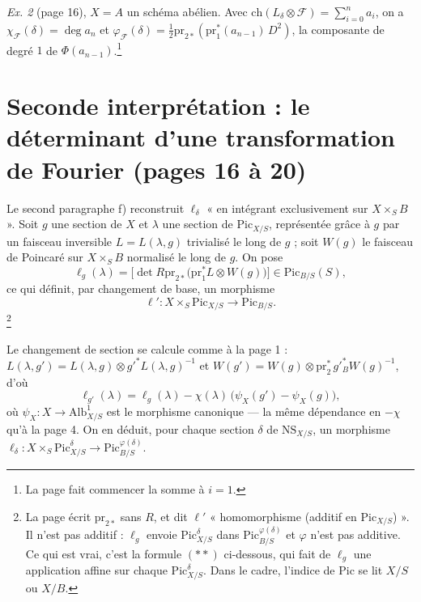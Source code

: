 \documentclass[11pt,a4paper]{article}
\begin{document}
\emph{Ex. 2} (page 16), $X = A$ un schéma abélien. Avec $\mathrm{ch}(L_{\delta}
\otimes \mathcal{F}) = \sum_{i=0}^{n} a_i$, on a $\chi_{\mathcal{F}}(\delta) =
\deg a_n$ et $\varphi_{\mathcal{F}}(\delta) = \tfrac{1}{2}\mathrm{pr}_{2*}
(\mathrm{pr}_1^{*}(a_{n-1})\,D^{2})$, la composante de degré $1$ de
$\Phi(a_{n-1})$.\footnote{La page fait commencer la somme à $i = 1$.}

\section*{Seconde interprétation : le déterminant d'une transformation de Fourier (pages 16 à 20)}

Le second paragraphe f) reconstruit $\ell_{\delta}$ « en intégrant
exclusivement sur $X \times_S B$ ». Soit $g$ une section de $X$ et $\lambda$
une section de $\mathrm{Pic}_{X/S}$, représentée grâce à $g$ par un faisceau
inversible $L = L(\lambda, g)$ trivialisé le long de $g$ ; soit $W(g)$ le
faisceau de Poincaré sur $X \times_S B$ normalisé le long de $g$. On pose
\[
\ell_g(\lambda) = \bigl[\det R\mathrm{pr}_{2*}\bigl(\mathrm{pr}_1^{*}L \otimes W(g)\bigr)\bigr]
\in \mathrm{Pic}_{B/S}(S),
\]
ce qui définit, par changement de base, un morphisme
\[
\ell' : X \times_S \mathrm{Pic}_{X/S} \longrightarrow \mathrm{Pic}_{B/S}.
\]
\footnote{La page écrit $\mathrm{pr}_{2*}$ sans $R$, et dit $\ell'$
« homomorphisme (additif en $\mathrm{Pic}_{X/S}$) ». Il n'est pas additif :
$\ell_g$ envoie $\mathrm{Pic}^{\delta}_{X/S}$ dans
$\mathrm{Pic}^{\varphi(\delta)}_{B/S}$ et $\varphi$ n'est pas additive. Ce
qui est vrai, c'est la formule $(**)$ ci-dessous, qui fait de $\ell_g$ une
application affine sur chaque $\mathrm{Pic}^{\delta}_{X/S}$. Dans le cadre,
l'indice de $\mathrm{Pic}$ se lit $X/S$ ou $X/B$.}

Le changement de section se calcule comme à la page 1 :
$L(\lambda, g') = L(\lambda, g) \otimes g'^{*}L(\lambda, g)^{-1}$ et
$W(g') = W(g) \otimes \mathrm{pr}_2^{*}\, g'^{*}_B W(g)^{-1}$, d'où
\[
\ell_{g'}(\lambda) = \ell_g(\lambda) - \chi(\lambda)\,\bigl(\psi_X(g') - \psi_X(g)\bigr),
\]
où $\psi_X : X \to \mathrm{Alb}^{1}_{X/S}$ est le morphisme canonique —
la même dépendance en $-\chi$ qu'à la page 4. On en déduit, pour chaque
section $\delta$ de $\mathrm{NS}_{X/S}$, un morphisme
$\ell_{\delta} : X \times_S \mathrm{Pic}^{\delta}_{X/S} \to
\mathrm{Pic}^{\varphi(\delta)}_{B/S}$.
\end{document}
